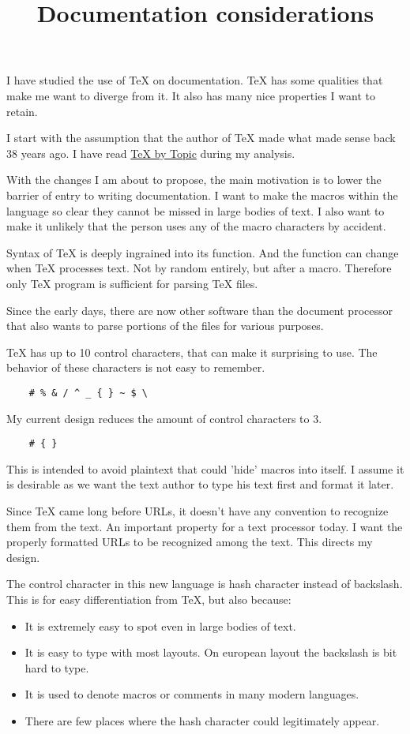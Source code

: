 \documentclass{article}
\begin{document}
\title{Documentation considerations}

I have studied the use of TeX on documentation. TeX has some
qualities that make me want to diverge from it. It also has
many nice properties I want to retain.

I start with the assumption that the author of TeX made what
made sense back 38 years ago. I have read
\href{http://eijkhout.net/texbytopic/texbytopic.html}{TeX by
Topic} during my analysis.

With the changes I am about to propose, the main motivation
is to lower the barrier of entry to writing documentation. I
want to make the macros within the language so clear they
cannot be missed in large bodies of text. I also want to
make it unlikely that the person uses any of the macro
characters by accident.

Syntax of TeX is deeply ingrained into its function. And the
function can change when TeX processes text. Not by random
entirely, but after a macro. Therefore only TeX program is
sufficient for parsing TeX files.

Since the early days, there are now other software than the
document processor that also wants to parse portions of the
files for various purposes.

TeX has up to 10 control characters, that can make it
surprising to use. The behavior of these characters is not
easy to remember.

\begin{verbatim}
    # % & / ^ _ { } ~ $ \
\end{verbatim}

My current design reduces the amount of control characters
to 3.

\begin{verbatim}
    # { }
\end{verbatim}

This is intended to avoid plaintext that could 'hide'
macros into itself. I assume it is desirable as we want
the text author to type his text first and format it later.

Since TeX came long before URLs, it doesn't have any
convention to recognize them from the text. An important
property for a text processor today. I want the properly
formatted URLs to be recognized among the text. This directs
my design.

The control character in this new language is hash character
instead of backslash. This is for easy differentiation from
TeX, but also because:
\begin{itemize}
    \item
        It is extremely easy to spot even in large bodies of
        text.
    \item
        It is easy to type with most layouts. On european
        layout the backslash is bit hard to type.
    \item
        It is used to denote macros or comments in many
        modern languages.
    \item
        There are few places where the hash character could
        legitimately appear.
\end{itemize}
\end{document}
